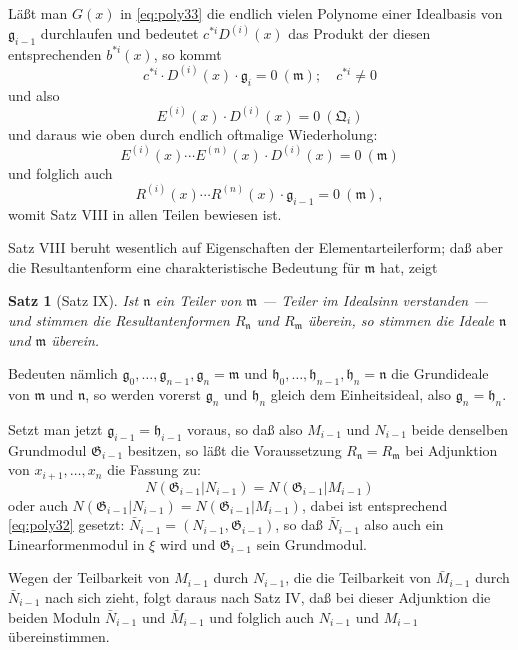 \documentclass[fontsize=10pt,paper=a5,pagesize,headings=small]{scrbook}
\newcommand{\ideal}[1]{\mathfrak{#1}}
\theoremstyle{plain}
\newtheorem*{satz}{Satz}
\begin{document}
Läßt man $G(x)$ in \eqref{eq:poly33} die endlich vielen Polynome einer Idealbasis von
$\ideal{g}_{i-1}$ durchlaufen und bedeutet $c^{*i} D^{(i)}(x)$ das Produkt der diesen entsprechenden
$b^{*i}(x)$, so kommt
\[ c^{*i} \cdot D^{(i)}(x) \cdot \ideal{g}_i = 0\ (\ideal{m});\quad c^{*i} \neq 0 \]
und also
\[ E^{(i)}(x) \cdot D^{(i)}(x) = 0\ (\ideal{Q}_i) \]
und daraus wie oben durch endlich oftmalige Wiederholung:
\[ E^{(i)}(x) \cdots E^{(n)}(x) \cdot D^{(i)}(x) = 0\ (\ideal{m}) \]
und folglich auch
\[ R^{(i)}(x) \cdots R^{(n)}(x) \cdot \ideal{g}_{i-1} = 0\ (\ideal{m}), \]
womit Satz VIII in allen Teilen bewiesen ist.

\newpage
\setcounter{page}{443}

Satz VIII beruht wesentlich auf Eigenschaften der Elementarteilerform; daß aber
die Resultantenform eine charakteristische Bedeutung für $\ideal{m}$ hat, zeigt

\begin{satz}[Satz IX]
Ist $\ideal{n}$ ein Teiler von $\ideal{m}$ --- Teiler im Idealsinn verstanden --- und stimmen die
Resultantenformen $R_{\ideal{n}}$ und $R_{\ideal{m}}$ überein, so stimmen die Ideale $\ideal{n}$ und $\ideal{m}$ überein.
\end{satz}

Bedeuten nämlich $\ideal{g}_0,\dots,\ideal{g}_{n-1},\ideal{g}_n = \ideal{m}$ und $\ideal{h}_0,\dots,\ideal{h}_{n-1},\ideal{h}_n = \ideal{n}$ die Grundideale
von $\ideal{m}$ und $\ideal{n}$, so werden vorerst $\ideal{g}_n$ und $\ideal{h}_n$ gleich dem Einheitsideal, also
$\ideal{g}_n = \ideal{h}_n$.

Setzt man jetzt $\ideal{g}_{i-1} = \ideal{h}_{i-1}$ voraus, so daß also $M_{i-1}$ und $N_{i-1}$ beide denselben
Grundmodul $\mathfrak{G}_{i-1}$ besitzen, so läßt die Voraussetzung $R_{\ideal{n}} = R_{\ideal{m}}$ bei Adjunktion von
$x_{i+1},\dots,x_n$ die Fassung zu:
\[ N(\mathfrak{G}_{i-1}|N_{i-1}) = N(\mathfrak{G}_{i-1}|M_{i-1}) \]
oder auch $N(\mathfrak{G}_{i-1}|N_{i-1}) = N(\mathfrak{G}_{i-1}|M_{i-1})$, dabei ist entsprechend
\eqref{eq:poly32} gesetzt: $\bar{N}_{i-1} = (N_{i-1}, \mathfrak{G}_{i-1})$, so daß $\bar{N}_{i-1}$ also auch ein
Linearformenmodul in $\xi$ wird und $\mathfrak{G}_{i-1}$ sein Grundmodul.

Wegen der Teilbarkeit von $M_{i-1}$ durch $N_{i-1}$, die die Teilbarkeit von $\bar{M}_{i-1}$
durch $\bar{N}_{i-1}$ nach sich zieht, folgt daraus nach Satz IV, daß bei dieser Adjunktion die
beiden Moduln $\bar{N}_{i-1}$ und $\bar{M}_{i-1}$ und folglich auch $N_{i-1}$ und $M_{i-1}$ übereinstimmen.
\end{document}
